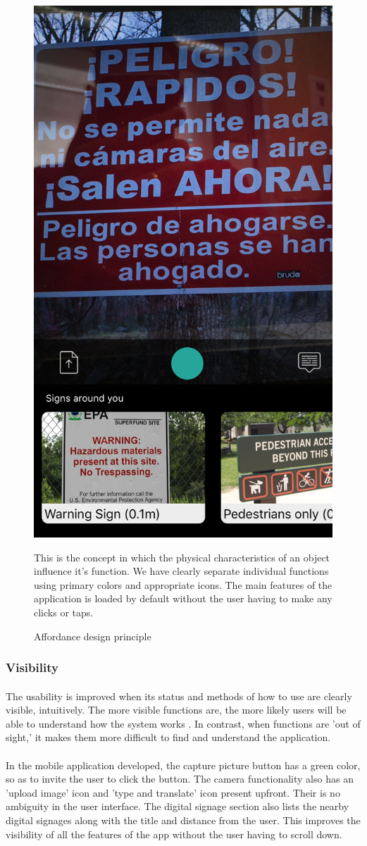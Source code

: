\documentclass[12pt]{article}
\begin{document}
    
    \begin{figure}[H]
	\centering
	\includegraphics[width=0.5\linewidth]{media/1a.PNG}
	\caption{Affordance design principle}
	\label{fig:affordance}{This is the concept in which the physical characteristics of an object influence it's function. We have clearly separate individual functions using primary colors and appropriate icons. The main features of the application is loaded by default without the user having to make any clicks or taps.}
\end{figure} 

    
    
     \subsubsection{Visibility}
     \paragraph{}The usability is improved when its status and methods of how to use are clearly visible, intuitively. The more visible functions are, the more likely users will be able to understand how the system works \cite{norman}. In contrast, when functions are 'out of sight,' it makes them more difficult to find and understand the application.
     
         \paragraph{} In the mobile application developed, the capture picture button has a green color, so as to invite the user to click the button. The camera functionality also has an 'upload image' icon and 'type and translate' icon present upfront. Their is no ambiguity in the user interface. The digital signage section also lists the nearby digital signages along with the title and distance from the user. This improves the visibility of all the features of the app without the user having to scroll down. 
     
\end{document}
